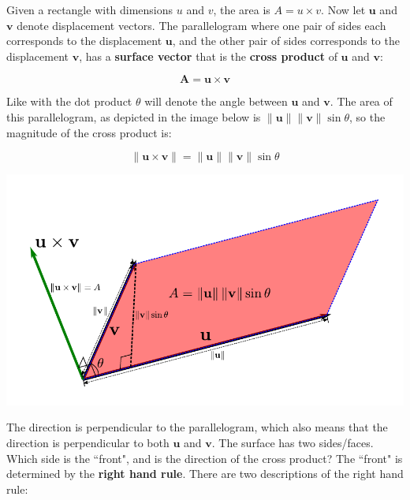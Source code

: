 \documentclass{article}
\begin{document}



Given a rectangle with dimensions \(u\) and \(v\), the area is \(A = u \times v\). Now let \(\mathbf{u}\) and \(\mathbf{v}\) denote displacement vectors. The parallelogram where one pair of sides each corresponds to the displacement \(\mathbf{u}\), and the other pair of sides corresponds to the displacement \(\mathbf{v}\), has a {\bf surface vector} that is the {\bf cross product} of \(\mathbf{u}\) and \(\mathbf{v}\):

\[\mathbf{A} = \mathbf{u} \times \mathbf{v}\]

Like with the dot product \(\theta\) will denote the angle between \(\mathbf{u}\) and \(\mathbf{v}\). The area of this parallelogram, as depicted in the image below is \(\|\mathbf{u}\| \|\mathbf{v}\| \sin\theta\), so the magnitude of the cross product is:

\[\left\|\mathbf{u} \times \mathbf{v}\right\| = \|\mathbf{u}\| \|\mathbf{v}\| \sin\theta\] 

\includegraphics[scale = 1]{cross_product}


The direction is perpendicular to the parallelogram, which also means that the direction is perpendicular to both \(\mathbf{u}\) and \(\mathbf{v}\). The surface has two sides/faces. Which side is the ``front", and is the direction of the cross product? The ``front" is determined by the {\bf right hand rule}. There are two descriptions of the right hand rule:
\end{document}
